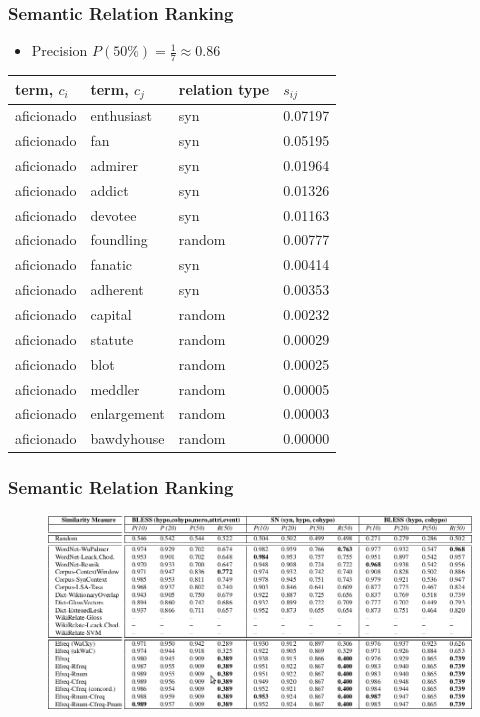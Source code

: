 \documentclass{beamer}
\begin{document}
\begin{frame}
\frametitle{Semantic Relation Ranking}

\begin{itemize}
	\item Precision $P(50\%)= \frac{1}{7} \approx 0.86 $
\end{itemize}

\begin{table}[h]\footnotesize
\begin{tabular}{ |l|l|l|l| }
\hline
 term, $c_i$ &  term, $c_j$ & relation type & \bf $s_{ij}$ \\ \hline \hline

aficionado & enthusiast & syn & 0.07197 \\
aficionado & fan & syn & 0.05195 \\
aficionado & admirer & syn & 0.01964 \\
aficionado & addict & syn & 0.01326 \\
aficionado & devotee & syn & 0.01163 \\
aficionado & foundling & random & 0.00777 \\
aficionado & fanatic & syn & 0.00414 \\ \hline
aficionado & adherent & syn & 0.00353 \\
aficionado & capital & random & 0.00232 \\
aficionado & statute & random & 0.00029 \\
aficionado & blot & random & 0.00025 \\
aficionado & meddler & random & 0.00005 \\
aficionado & enlargement & random &	0.00003 \\
aficionado & bawdyhouse & random & 	0.00000 \\ 
\hline
\end{tabular}
\end {table}

\end{frame}

\begin{frame}
\frametitle{Semantic Relation Ranking}

\begin{figure}	
	\centering
	\includegraphics[width=1.0\textwidth]{figures/res-relations}
\end{figure}

\end{frame}
\end{document}
